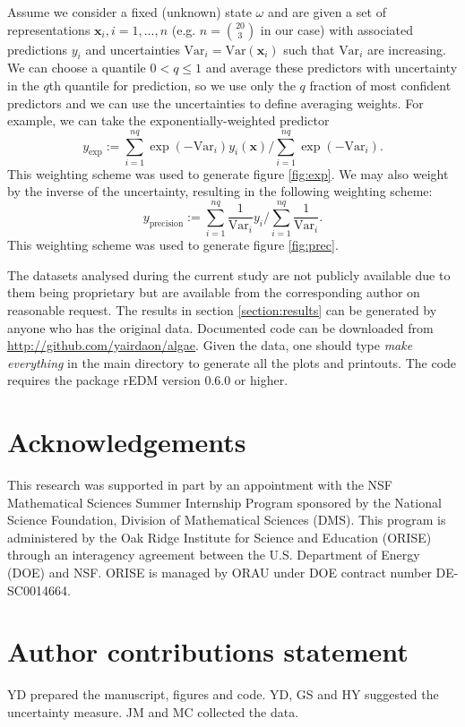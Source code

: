 \documentclass[fleqn,10pt]{wlscirep}
\newcommand{\un}{\text{Var}}
\newcommand{\x}{\mathbf{x}}
\begin{document}
Assume we consider a fixed (unknown) state $\omega$ and are given a
set of representations $\x_i, i =1,...,n$ (e.g. $n = \binom{20}{3}$ in
our case) with associated predictions $y_i$ and uncertainties $\un_i =
\un(\x_i)$ such that $\un_i$ are increasing. We can choose a quantile
$0 < q \leq 1$ and average these predictors with uncertainty in the
$q$th quantile for prediction, so we use only the $q$ fraction of most
confident predictors and we can use the uncertainties to define
averaging weights. For example, we can take the exponentially-weighted
predictor
\begin{equation*}
  y_{\text{exp}}  := \sum_{i=1}^{nq} \exp(-\un_i) y_i(\x) \bigg / \sum_{i=1}^{nq} \exp(-\un_i).
\end{equation*}
This weighting scheme was used to generate figure \ref{fig:exp}. We
may also weight by the inverse of the uncertainty, resulting in the
following weighting scheme:
\begin{equation*}
  y_{\text{precision}} := \sum_{i=1}^{nq} \frac{1}{\un_i} y_i \bigg / \sum_{i=1}^{nq} \frac{1}{\un_i}.
\end{equation*}
This weighting scheme was used to generate figure \ref{fig:prec}.

The datasets analysed during the current study are not publicly
available due to them being proprietary but are available from the
corresponding author on reasonable request. The results in section
\ref{section:results} can be generated by anyone who has the original
data. Documented code can be downloaded from
\url{http://github.com/yairdaon/algae}. Given the data, one should
type \emph{make everything} in the main directory to generate all the
plots and printouts. The code requires the package rEDM version 0.6.0
or higher.



\section*{Acknowledgements}
This research was supported in part by an appointment with the NSF
Mathematical Sciences Summer Internship Program sponsored by the
National Science Foundation, Division of Mathematical Sciences
(DMS). This program is administered by the Oak Ridge Institute for
Science and Education (ORISE) through an interagency agreement between
the U.S. Department of Energy (DOE) and NSF. ORISE is managed by ORAU
under DOE contract number DE-SC0014664.

\section*{Author contributions statement}
YD prepared the manuscript, figures and code. YD, GS and HY
suggested the uncertainty measure. JM and MC collected the data.
\end{document}
